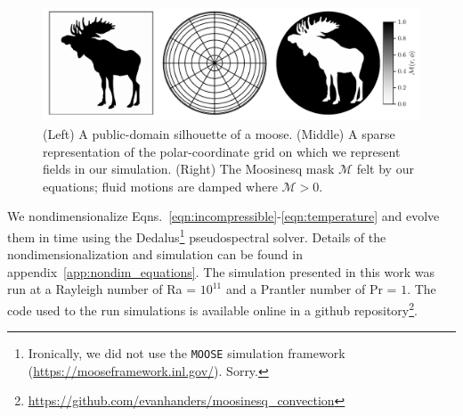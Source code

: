 \begin{figure}[t!]
\centering
\includegraphics[width=\textwidth]{paper_figure01.pdf}
    \caption{ 
        (Left) A public-domain silhouette of a moose.
        (Middle) A sparse representation of the polar-coordinate grid on which we represent fields in our simulation.
        (Right) The Moosinesq mask $\mathcal{M}$ felt by our equations; fluid motions are damped where $\mathcal{M} > 0$.
        \label{fig:methods}
    }
\end{figure}

We nondimensionalize Eqns.~\ref{eqn:incompressible}-\ref{eqn:temperature} and evolve them in time using the Dedalus\footnote{Ironically, we did not use the \texttt{MOOSE} simulation framework (\url{https://mooseframework.inl.gov/}). Sorry.} \citep{burns_etal_2020} pseudospectral solver.
Details of the nondimensionalization and simulation can be found in appendix~\ref{app:nondim_equations}.
The simulation presented in this work was run at a Rayleigh number of Ra = $10^{11}$ and a Prantler number of Pr = $1$.
The code used to the run simulations is available online in a github repository\footnote{\url{https://github.com/evanhanders/moosinesq_convection}}.
